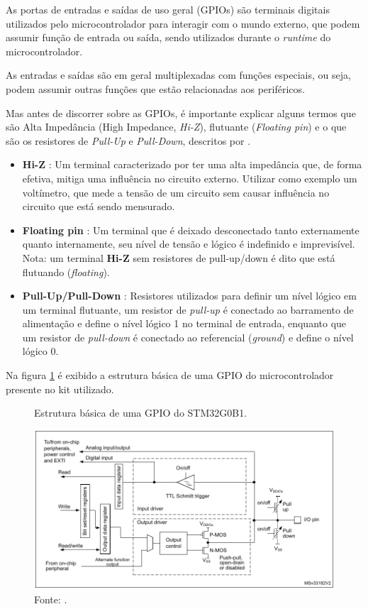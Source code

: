 \documentclass[12pt,a4paper]{report}
\begin{document}
As portas de entradas e saídas de uso geral (GPIOs) são terminais digitais utilizados pelo microcontrolador para interagir com o mundo externo, que podem assumir função de entrada ou saída, sendo utilizados durante o \textit{runtime} do microcontrolador.

As entradas e saídas são em geral multiplexadas com funções especiais, ou seja, podem assumir outras funções que estão relacionadas aos periféricos.

Mas antes de discorrer sobre as GPIOs, é importante explicar alguns termos que são Alta Impedância (High Impedance, \textit{Hi-Z}), flutuante (\textit{Floating pin}) e o que são os resistores de \textit{Pull-Up} e \textit{Pull-Down}, descritos por \cite{ci:od_vs_pp}.

\begin{itemize}
    \item \textbf{Hi-Z} : Um terminal caracterizado por ter uma alta impedância que, de forma efetiva, mitiga uma influência no circuito externo. Utilizar como exemplo um voltímetro, que mede a tensão de um circuito sem causar influência no circuito que está sendo mensurado.
    \item \textbf{Floating pin} : Um terminal que é deixado desconectado tanto externamente quanto internamente, seu nível de tensão e lógico é indefinido e imprevisível. Nota: um terminal \textbf{Hi-Z} sem resistores de pull-up/down é dito que está flutuando (\textit{floating}).
    \item \textbf{Pull-Up/Pull-Down} : Resistores utilizados para definir um nível lógico em um terminal flutuante, um resistor de \textit{pull-up} é conectado ao barramento de alimentação e define o nível lógico 1 no terminal de entrada, enquanto que um resistor de \textit{pull-down} é conectado ao referencial (\textit{ground}) e define o nível lógico 0.
\end{itemize}

Na figura \ref{fig:basic_gpio_structure} é exibido a estrutura básica de uma GPIO do microcontrolador presente no kit utilizado.

\begin{figure}[H]
    \centering
    \caption{Estrutura básica de uma GPIO do STM32G0B1.}
    \includegraphics[scale=0.5]{fig/basic_gpio_structure.png}
    \caption*{Fonte: \cite{ci:rm0444}.}
    \label{fig:basic_gpio_structure}
\end{figure}
\end{document}
